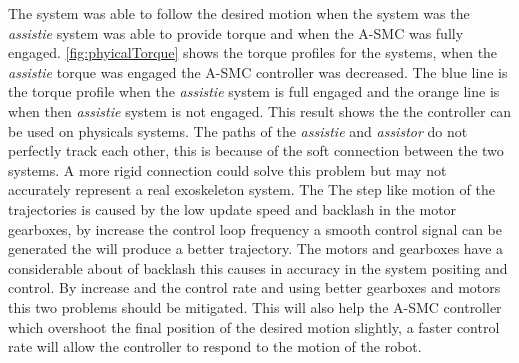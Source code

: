 The system was able to follow the desired motion when the system was the \textit{assistie} system was able to provide torque and when the A-SMC was fully engaged. \autoref{fig:phyicalTorque} shows the torque profiles for the systems, when the  \textit{assistie} torque was engaged the A-SMC controller was decreased. The blue line is the torque profile when the  \textit{assistie} system is full engaged and the orange line is when then \textit{assistie} system is not engaged. This result shows the the controller can be used on physicals systems. The paths of the  \textit{assistie} and  \textit{assistor} do not perfectly track each other, this is because of the soft connection between the two systems. A more rigid connection could solve this problem but may not accurately represent a real exoskeleton system. The The step like motion of the trajectories is caused by the low update speed and backlash in the motor gearboxes, by increase the control loop frequency a smooth control signal can be generated the will produce a better trajectory. The motors and gearboxes have a considerable about of backlash this causes in accuracy in the system positing and control. By increase and the control rate and using better gearboxes and motors this two problems should be mitigated.  This will also help the A-SMC controller which overshoot the final position of the desired motion slightly, a faster control rate will allow the controller to respond to the motion of the robot. 



